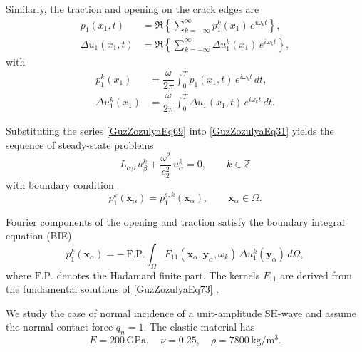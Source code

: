 Similarly, the traction and opening on the crack edges are
\begin{equation}\label{GuzZozulyaEq71}
	\begin{aligned}
		p_1(x_1,t)
		&= \Re\left\{\sum_{k=-\infty}^{\infty} p_1^k(x_1)\,e^{i\omega_k t}\right\},\\
		\Delta u_1(x_1,t)
		&= \Re\left\{\sum_{k=-\infty}^{\infty} \Delta u_1^k(x_1)\,e^{i\omega_k t}\right\},
	\end{aligned}
\end{equation}
with
\begin{equation}\label{GuzZozulyaEq72}
	\begin{array}{ll}
		p_1^k(x_1)
	&= \dfrac{\omega}{2\pi} \displaystyle\int_0^T p_1(x_1,t)\,e^{i\omega_k t}\,dt,
	\\
	\Delta u_1^k(x_1)
	&= \dfrac{\omega}{2\pi} \displaystyle\int_0^T \Delta u_1(x_1,t)\,e^{i\omega_k t}\,dt.
	\end{array}
\end{equation}

Substituting the series \eqref{GuzZozulyaEq69} into \eqref{GuzZozulyaEq31}
yields the sequence of steady-state problems
\begin{equation}\label{GuzZozulyaEq73}
	L_{\alpha\beta}\,u_\beta^k
	+ \frac{\omega^2}{c_2^2} \, u_\alpha^k = 0,
	\qquad k \in \mathbb{Z}
\end{equation}
with boundary condition
\begin{equation}\label{GuzZozulyaEq74}
	p_1^k(\mathbf{x}_\alpha) = p_1^{s,k}(\mathbf{x}_\alpha),
	\qquad \mathbf{x}_\alpha\in\Omega.
\end{equation}

Fourier components of the opening and traction satisfy the boundary integral
equation (BIE)
\begin{equation}\label{GuzZozulyaEq75}
	p_1^k(\mathbf{x}_\alpha)
	= -\,\mathrm{F.P.}
	\int_\Omega
	F_{11}(\mathbf{x}_\alpha,\mathbf{y}_\alpha,\omega_k)\,
	\Delta u_1^k(\mathbf{y}_\alpha)\,d\Omega,
\end{equation}
where $\mathrm{F.P.}$ denotes the Hadamard finite part.  
The kernels $F_{11}$ are derived from the fundamental solutions of
\eqref{GuzZozulyaEq73}
\cite{GuzZozulyaRef3,GuzZozulyaRef8,GuzZozulyaRef31,GuzZozulyaRef9}.

We study the case of normal incidence of a unit-amplitude SH-wave
and assume the normal contact force $q_n=1$.  
The elastic material has
\[
E = 200\,\mathrm{GPa}, \quad
\nu = 0.25, \quad
\rho = 7800\,\mathrm{kg/m^3}.
\]

